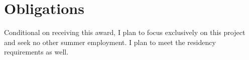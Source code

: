 \documentclass[12pt]{article}
\begin{document}
\section{Obligations}

Conditional on receiving this award, I plan to focus exclusively on this project and seek no other summer employment. I plan to meet the residency requirements as well. \\


\clearpage
\singlespace
% 
% 




%

\end{document}
